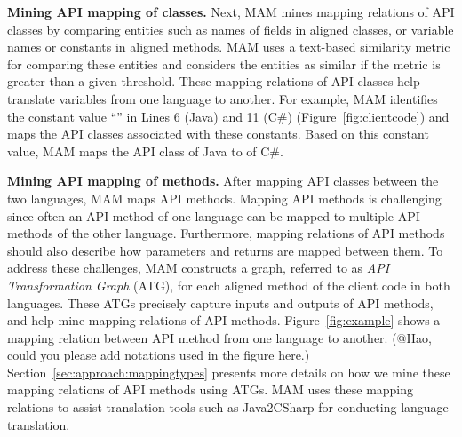 \textbf{Mining API mapping of classes.} Next, MAM mines mapping
relations of API classes by comparing entities such as names of
fields in aligned classes, or variable names or constants in aligned
methods. MAM uses a text-based similarity metric for comparing these
entities and considers the entities as similar if the metric is
greater than a given threshold. These mapping relations of API
classes help translate variables from one language to another. For
example, MAM identifies the constant value ``'' in
Lines 6 (Java) and 11 (C\#) (Figure~\ref{fig:clientcode}) and maps
the API classes associated with these constants. Based on this
constant value, MAM maps the API class  of Java
to  of C\#.

\textbf{Mining API mapping of methods.} After mapping API classes
between the two languages, MAM maps API methods. Mapping API methods
is challenging since often an API method of one language can be
mapped to multiple API methods of the other language. Furthermore,
mapping relations of API methods should also describe how parameters
and returns are mapped between them. To address these challenges,
MAM constructs a graph, referred to as \emph{API Transformation
Graph} (ATG), for each aligned method of the client code in both
languages. These ATGs precisely capture inputs and outputs of API
methods, and help mine mapping relations of API methods.
Figure~\ref{fig:example} shows a mapping relation between API method
 from one language to another. (@Hao, could you
please add notations used in the figure here.)
Section~\ref{sec:approach:mappingtypes} presents more details on how
we mine these mapping relations of API methods using ATGs. MAM uses
these mapping relations to assist translation tools such as
Java2CSharp for conducting language translation.

